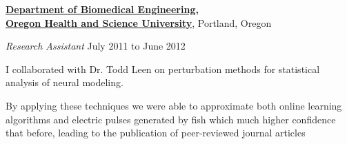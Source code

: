 \documentclass[10pt]{article}
\newenvironment{outerlist}[1][\enskip$\circ$]%
        {\begin{itemize}[#1]}{\end{itemize}%
         \vspace{-.6\baselineskip}}
\newenvironment{innerlist}[1][\enskip$\circ$]%
        {\begin{compactitem}[#1]}{\end{compactitem}}
\begin{document}
\begin{outerlist}
\begin{innerlist}


\end{innerlist}
\end{outerlist}
\medbreak
\href{http://www.ogi.edu/bme}{\textbf{Department of Biomedical Engineering, \\Oregon Health and Science University}},
Portland, Oregon
\begin{outerlist}
\item[] \textit{Research Assistant}%
    \hfill {July 2011 to June 2012}
     \begin{innerlist}
     \item I collaborated with Dr. Todd Leen on perturbation methods for statistical analysis
of neural modeling.
     \item By applying these techniques we were able to approximate  both online learning algorithms and electric pulses generated by fish which much higher confidence that before, leading to the publication of peer-reviewed journal articles
     \end{innerlist}
   \end{outerlist}
  
\end{document}
